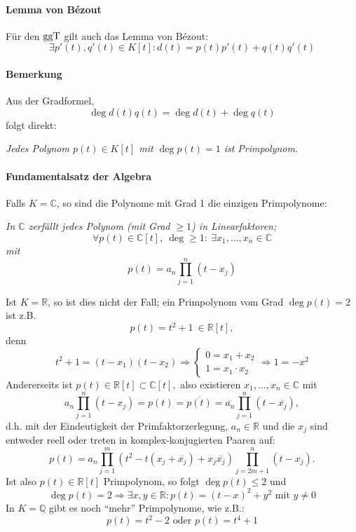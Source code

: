\paragraph{Lemma von B\'ezout}
	\begin{Lemma}
	Für den $ \operatorname{ggT} $ gilt auch das Lemma von B\'ezout:
		\[ \exists p'(t),q'(t)\in K[t]: d(t)=p(t)p'(t)+q(t)q'(t) \]
	\end{Lemma}
\paragraph{Bemerkung}
	Aus der Gradformel,
		\[ \deg d(t)q(t) = \deg d(t)+\deg q(t) \]
	folgt direkt:
		\begin{addmargin}{1cm}
			\textit{Jedes Polynom $ p(t)\in K[t] $ mit $ \deg p(t)=1 $ ist Primpolynom.}
		\end{addmargin}

\paragraph{Fundamentalsatz der Algebra}
	Falls $ K = \mathbb{C} $, so sind die Polynome mit Grad 1 die einzigen Primpolynome:
		\begin{Satz}
		\begin{addmargin}{1cm}
			\textit{In $ \mathbb{C} $ zerfällt jedes Polynom (mit Grad $ \geq 1 $) in Linearfaktoren;
				\[ \forall p(t)\in \mathbb{C}[t],\ \deg \geq 1:\ \exists x_1,\dots,x_n \in \mathbb{C} \]
			mit
				\[ p(t) = a_n \prod_{j=1}^{n}(t-x_j) \]}
		\end{addmargin}
		\end{Satz}
	Ist $ K=\mathbb{R} $, so ist dies nicht der Fall; ein Primpolynom vom Grad $ \deg p(t) = 2 $ ist z.B.
		\[ p(t) = t^2+1\ \in \mathbb{R}[t], \]
	denn
		\[ t^2+1 = (t-x_1)(t-x_2) \Rightarrow
			\begin{cases}
				0 = x_1 + x_2\\
				1 = x_1 \cdot x_2
			\end{cases}
		\Rightarrow 1 = -x^2 \]
	Andererseits ist $ p(t)\in \mathbb{R}[t]\subset \mathbb{C}[t], $
	also existieren $ x_1,\dots,x_n\in \mathbb{C} $ mit
		\[ a_n\prod_{j=1}^{n}(t-x_j) = p(t) = \overline{p(t)} = \overline{a_n}\prod_{j=1}^{n}(t-\overline{x_j}), \]
	d.h. mit der Eindeutigkeit der Primfaktorzerlegung, $ a_n\in \mathbb{R} $ und die $ x_j $ sind entweder reell oder treten in komplex-konjugierten Paaren auf:
		\[ p(t) = a_n\prod_{j=1}^{m}(t^2-t(x_j+\overline{x_j})+x_j\overline{x_j})\prod_{j=2m+1}^{n}(t-x_j). \]
	Ist also $ p(t) \in \mathbb{R}[t] $ Primpolynom, so folgt $ \deg p(t)\leq 2 $ und
		\[ \deg p(t) = 2 \Rightarrow \exists x,y\in \mathbb{R}: p(t) = (t-x)^2+y^2 \text{ mit } y\neq 0\]
	In $ K=\mathbb{Q} $ gibt es noch "`mehr"' Primpolynome, wie z.B.:
		\[ p(t) = t^2-2 \text{ oder } p(t) = t^4+1 \]